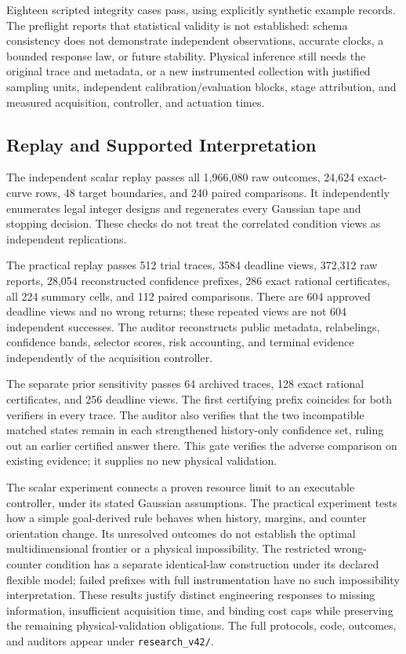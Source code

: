 Eighteen scripted integrity cases pass, using explicitly synthetic example
records. The preflight reports that statistical validity is not established:
schema consistency does not demonstrate independent observations, accurate
clocks, a bounded response law, or future stability. Physical inference
still needs the original trace and metadata, or a new instrumented collection
with justified sampling units, independent calibration/evaluation blocks,
stage attribution, and measured acquisition, controller, and actuation times.

\balance
\subsection{Replay and Supported Interpretation}

The independent scalar replay passes all 1,966,080 raw outcomes,
24,624 exact-curve rows, 48 target boundaries, and 240 paired comparisons.
It independently enumerates legal integer designs and regenerates every
Gaussian tape and stopping decision. These checks do not treat the
correlated condition views as independent replications.

The practical replay passes 512 trial traces, 3584 deadline views,
372,312 raw reports, 28,054 reconstructed confidence prefixes, 286 exact
rational certificates, all 224 summary cells, and 112 paired comparisons.
There are 604 approved deadline views and no wrong returns; these repeated
views are not 604 independent successes. The auditor reconstructs public
metadata, relabelings, confidence bands, selector scores, risk accounting,
and terminal evidence independently of the acquisition controller.

The separate prior sensitivity passes 64 archived traces, 128 exact
rational certificates, and 256 deadline views. The first certifying prefix
coincides for both verifiers in every trace. The auditor also verifies that
the two incompatible matched states remain in each strengthened
history-only confidence set, ruling out an earlier certified answer there.
This gate verifies the adverse comparison on existing evidence; it supplies
no new physical validation.

The scalar experiment connects a proven resource limit to an executable
controller, under its stated Gaussian assumptions. The practical experiment
tests how a simple goal-derived rule behaves when history, margins, and
counter orientation change. Its unresolved outcomes do not establish the
optimal multidimensional frontier or a physical impossibility. The restricted wrong-counter condition has a separate identical-law
construction under its declared flexible model; failed prefixes with full
instrumentation have no such impossibility interpretation. These results justify distinct engineering
responses to missing information, insufficient acquisition time, and binding
cost caps while preserving the remaining physical-validation obligations.
The full protocols, code, outcomes, and auditors appear under
\texttt{research\_v42/}.
